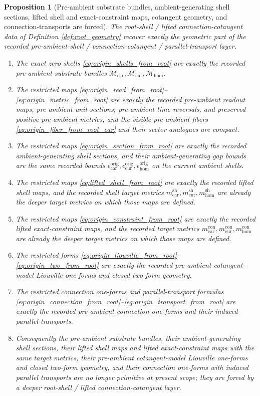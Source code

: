 \documentclass[11pt]{article}
\newcommand{\TensorConstraintMetric}{m_{\mathrm{car}}^{\mathrm{con}}}
\newcommand{\CurConstraintMetric}{m_{\mathrm{cur}}^{\mathrm{con}}}
\newcommand{\HomConstraintMetric}{m_{\mathrm{hom}}^{\mathrm{con}}}
\newcommand{\TensorShellMetric}{m_{\mathrm{car}}^{\mathrm{sh}}}
\newcommand{\CurShellMetric}{m_{\mathrm{cur}}^{\mathrm{sh}}}
\newcommand{\HomShellMetric}{m_{\mathrm{hom}}^{\mathrm{sh}}}
\newcommand{\TensorOriginSpace}{\mathcal M_{\mathrm{car}}}
\newcommand{\CurOriginSpace}{\mathcal M_{\mathrm{cur}}}
\newcommand{\HomOriginSpace}{\mathcal M_{\mathrm{hom}}}
\newcommand{\TensorOriginGap}{\epsilon_{\mathrm{car}}^{\mathrm{orig}}}
\newcommand{\CurOriginGap}{\epsilon_{\mathrm{cur}}^{\mathrm{orig}}}
\newcommand{\HomOriginGap}{\epsilon_{\mathrm{hom}}^{\mathrm{orig}}}
\newtheorem{proposition}{Proposition}
\begin{document}
\begin{proposition}[Pre-ambient substrate bundles, ambient-generating shell sections, lifted shell and exact-constraint maps, cotangent geometry, and connection-transports are forced]
\label{prop:origin_geometry_forced}
The root-shell / lifted connection-cotangent data of Definition \ref{def:root_geometry} recover exactly the geometric part of the recorded pre-ambient-shell / connection-cotangent / parallel-transport layer.
\begin{enumerate}
    \item The exact zero shells \eqref{eq:origin_shells_from_root} are exactly the recorded pre-ambient substrate bundles \(\TensorOriginSpace,\CurOriginSpace,\HomOriginSpace\).
    \item The restricted maps \eqref{eq:origin_read_from_root}--\eqref{eq:origin_metric_from_root} are exactly the recorded pre-ambient readout maps, pre-ambient unit sections, pre-ambient time reversals, and preserved positive pre-ambient metrics, and the visible pre-ambient fibers \eqref{eq:origin_fiber_from_root_car} and their sector analogues are compact.
    \item The restricted maps \eqref{eq:origin_section_from_root} are exactly the recorded ambient-generating shell sections, and their ambient-generating gap bounds are the same recorded bounds \(\TensorOriginGap,\CurOriginGap,\HomOriginGap\) on the current ambient shells.
    \item The restricted maps \eqref{eq:lifted_shell_from_root} are exactly the recorded lifted shell maps, and the recorded shell target metrics \(\TensorShellMetric,\CurShellMetric,\HomShellMetric\) are already the deeper target metrics on which those maps are defined.
    \item The restricted maps \eqref{eq:origin_constraint_from_root} are exactly the recorded lifted exact-constraint maps, and the recorded target metrics \(\TensorConstraintMetric,\CurConstraintMetric,\HomConstraintMetric\) are already the deeper target metrics on which those maps are defined.
    \item The restricted forms \eqref{eq:origin_liouville_from_root}--\eqref{eq:origin_two_from_root} are exactly the recorded pre-ambient cotangent-model Liouville one-forms and closed two-form geometry.
    \item The restricted connection one-forms and parallel-transport formulas \eqref{eq:origin_connection_from_root}--\eqref{eq:origin_transport_from_root} are exactly the recorded pre-ambient connection one-forms and their induced parallel transports.
    \item Consequently the pre-ambient substrate bundles, their ambient-generating shell sections, their lifted shell maps and lifted exact-constraint maps with the same target metrics, their pre-ambient cotangent-model Liouville one-forms and closed two-form geometry, and their connection one-forms with induced parallel transports are no longer primitive at present scope; they are forced by a deeper root-shell / lifted connection-cotangent layer.
\end{enumerate}
\end{proposition}
\end{document}
